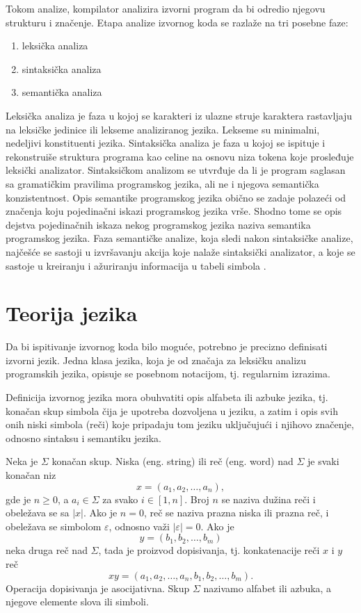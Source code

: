 \documentclass[12pt,oneside]{memoir}
\theoremstyle{plain}
\theoremstyle{definition}
\begin{document}
Tokom analize, kompilator analizira izvorni program da bi odredio njegovu strukturu i značenje. Etapa analize izvornog koda se razlaže na tri posebne faze:
\begin{enumerate}
\item leksička analiza
\item sintaksička analiza
\item semantička analiza
\end{enumerate}

Leksička analiza je faza u kojoj se karakteri iz ulazne struje karaktera rastavljaju na leksičke jedinice ili lekseme analiziranog jezika. Lekseme su minimalni, nedeljivi konstituenti jezika. Sintaksička analiza je faza u kojoj se ispituje i rekonstruiše struktura programa kao celine na osnovu niza tokena koje prosleđuje leksički analizator. Sintaksičkom analizom se utvrđuje da li je program saglasan sa gramatičkim pravilima programskog jezika, ali ne i njegova semantička konzistentnost. Opis semantike programskog jezika obično se zadaje polazeći od značenja koju pojedinačni iskazi programskog jezika vrše. Shodno tome se opis dejstva pojedinačnih iskaza nekog programskog jezika naziva semantika programskog jezika. Faza semantičke analize, koja sledi nakon sintaksičke analize, najčešće se sastoji u izvršavanju akcija koje nalaže sintaksički analizator, a koje se sastoje u kreiranju i ažuriranju informacija u tabeli simbola \cite{Vitas}.

\section{Teorija jezika}
Da bi ispitivanje izvornog koda bilo moguće, potrebno je precizno definisati izvorni jezik. Jedna klasa jezika, koja je od značaja za leksičku analizu programskih jezika, opisuje se posebnom notacijom, tj. regularnim izrazima.

Definicija izvornog jezika mora obuhvatiti opis alfabeta ili azbuke jezika, tj. konačan skup simbola čija je upotreba dozvoljena u jeziku, a zatim i opis svih onih niski simbola (reči) koje pripadaju tom jeziku uključujući i njihovo značenje, odnosno sintaksu i semantiku jezika. 

Neka je $\Sigma$  konačan skup. Niska (eng. string) ili reč (eng. word) nad $\Sigma$ je svaki konačan niz $$x = (a_1, a_2, …, a_n),$$ gde je $n \geq 0$, a $a_i \in \Sigma$ za svako $\textit{i} \in [1,n]$. Broj $n$ se naziva dužina reči i obeležava se sa $|x|$. Ako je $n=0$, reč se naziva prazna niska ili prazna reč, i obeležava se simbolom $\varepsilon$, odnosno važi $| \varepsilon |=0$.  Ako je $$y = (b_1, b_2, …, b_m)$$ neka druga reč nad $\Sigma$, tada je proizvod dopisivanja, tj. konkatenacije reči $x$ i $y$ reč $$xy =(a_1, a_2, …, a_n, b_1, b_2, …, b_m).$$
Operacija dopisivanja je asocijativna. Skup $\Sigma$ nazivamo alfabet ili azbuka, a njegove elemente slova ili simboli.
\end{document}
